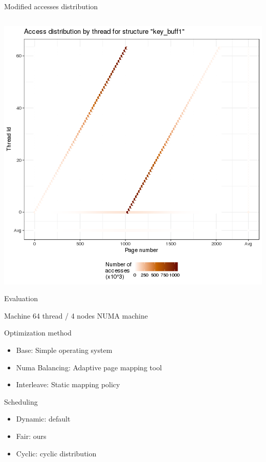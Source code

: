 \documentclass[xcolor={usenames,dvipsnames},hyperref={pdfusetitle}]{beamer}
\begin{document}
\begin{frame}{Modified accesses distribution}
{\begin{columns}
\begin{column}{.45\linewidth}
            \end{column}
        \end{columns}
    }{
        \centering
        \includegraphics[width=.65\linewidth]{tabarnac/is_b_kb1_dist_m.png}
    }
    \pause
\end{frame}

\begin{frame}{Evaluation}
    \begin{block}{Machine}
        64 thread / 4 nodes NUMA machine
    \end{block}
    \pause
    \begin{block}{Optimization method}
        \begin{itemize}
            \item Base: Simple operating system
            \item Numa Balancing: Adaptive page mapping tool
            \item Interleave: Static mapping policy
        \end{itemize}
    \end{block}
    \pause
    \begin{alertblock}{Scheduling}
        \begin{itemize}
            \item Dynamic: default
            \item Fair: ours
            \item Cyclic: cyclic distribution
        \end{itemize}
    \end{alertblock}
\end{frame}
\end{document}
